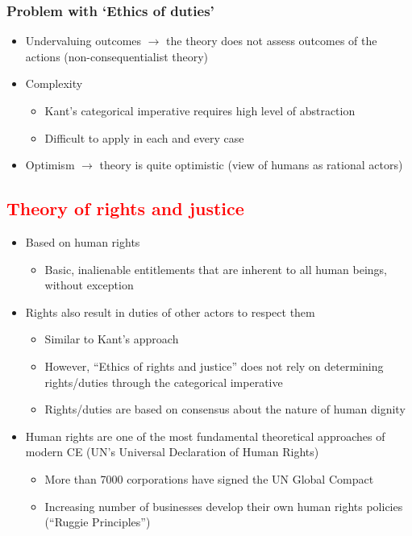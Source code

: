 \documentclass{article}
\DeclareRobustCommand{\k}[1]{\textcolor{red}{#1}}
\begin{document}
\subsubsection{Problem with `Ethics of duties'}
\begin{itemize}
    \item Undervaluing outcomes $\to$ the theory does not assess outcomes of the actions (non-consequentialist theory)
    \item Complexity
    \begin{itemize}
        \item Kant's categorical imperative requires high level of abstraction
        \item Difficult to apply in each and every case
    \end{itemize}
    \item Optimism $\to$ theory is quite optimistic (view of humans as rational actors)
\end{itemize}

\subsection{\k{Theory of rights and justice}}
\begin{itemize}
    \item Based on human rights
    \begin{itemize}[label=$\to$]
        \item Basic, inalienable entitlements that are inherent to all human beings, without exception
    \end{itemize}
    \item Rights also result in duties of other actors to respect them
    \begin{itemize}[label=$\to$]
        \item Similar to Kant's approach
        \item However, ``Ethics of rights and justice'' does not rely on determining rights/duties through the categorical imperative
        \item Rights/duties are based on consensus about the nature of human dignity
    \end{itemize}
    \item Human rights are one of the most fundamental theoretical approaches of modern CE (UN's Universal Declaration of Human Rights)
    \begin{itemize}[label=$\to$]
        \item More than 7000 corporations have signed the UN Global Compact
        \item Increasing number of businesses develop their own human rights policies (``Ruggie Principles'')
    \end{itemize}
\end{itemize}
\end{document}
